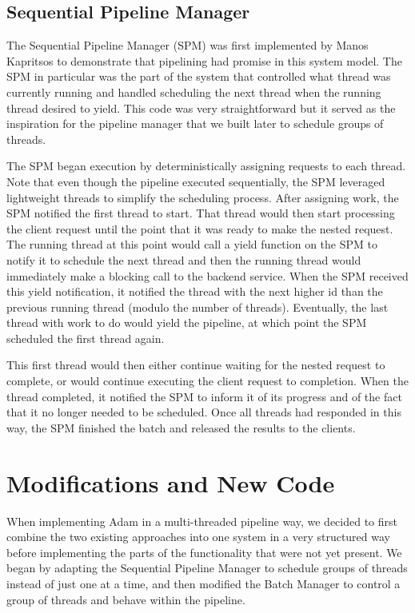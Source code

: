 \documentclass[11pt, oneside]{report}
\begin{document}
\subsection{Sequential Pipeline Manager}

The Sequential Pipeline Manager (SPM) was first implemented by Manos Kapritsos to demonstrate that pipelining had promise in this system model. 
The SPM in particular was the part of the system that controlled what thread was currently running and handled scheduling the next thread when the running thread desired to yield. 
This code was very straightforward but it served as the inspiration for the pipeline manager that we built later to schedule groups of threads.

The SPM began execution by deterministically assigning requests to each thread. 
Note that even though the pipeline executed sequentially, the SPM leveraged lightweight threads to simplify the scheduling process. 
After assigning work, the SPM notified the first thread to start. 
That thread would then start processing the client request until the point that it was ready to make the nested request. 
The running thread at this point would call a yield function on the SPM to notify it to schedule the next thread and then the running thread would immediately make a blocking call to the backend service. 
When the SPM received this yield notification, it notified the thread with the next higher id than the previous running thread (modulo the number of threads). 
Eventually, the last thread with work to do would yield the pipeline, at which point the SPM scheduled the first thread again. 


This first thread would then either continue waiting for the nested request to complete, or would continue executing the client request to completion. 
When the thread completed, it notified the SPM to inform it of its progress and of the fact that it no longer needed to be scheduled. 
Once all threads had responded in this way, the SPM finished the batch and released the results to the clients.

\section{Modifications and New Code}

When implementing Adam in a multi-threaded pipeline way, we decided to first combine the two existing approaches into one system in a very structured way before implementing the parts of the functionality that were not yet present. 
We began by adapting the Sequential Pipeline Manager to schedule groups of threads instead of just one at a time, and then modified the Batch Manager to control a group of threads and behave within the pipeline.
\end{document}
